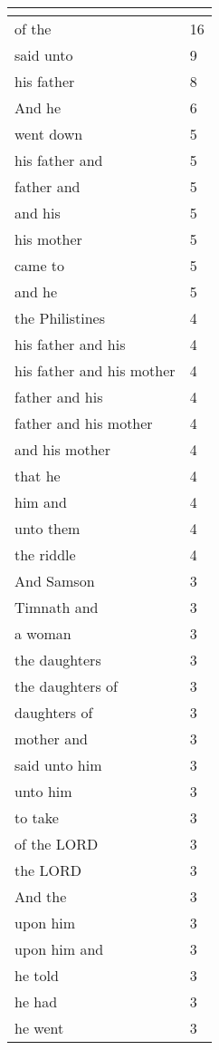\begin{center}
\begin{longtable}{|p{3.0in}|p{0.5in}|}
\hline \multicolumn{2}{c}{{ }} \\ \hline
\endfoot 
of the & 16\\ \hline 
said unto & 9\\ \hline 
his father & 8\\ \hline 
And he & 6\\ \hline 
went down & 5\\ \hline 
his father and & 5\\ \hline 
father and & 5\\ \hline 
and his & 5\\ \hline 
his mother & 5\\ \hline 
came to & 5\\ \hline 
and he & 5\\ \hline 
the Philistines & 4\\ \hline 
his father and his & 4\\ \hline 
his father and his mother & 4\\ \hline 
father and his & 4\\ \hline 
father and his mother & 4\\ \hline 
and his mother & 4\\ \hline 
that he & 4\\ \hline 
him and & 4\\ \hline 
unto them & 4\\ \hline 
the riddle & 4\\ \hline 
And Samson & 3\\ \hline 
Timnath and & 3\\ \hline 
a woman & 3\\ \hline 
the daughters & 3\\ \hline 
the daughters of & 3\\ \hline 
daughters of & 3\\ \hline 
mother and & 3\\ \hline 
said unto him & 3\\ \hline 
unto him & 3\\ \hline 
to take & 3\\ \hline 
of the LORD & 3\\ \hline 
the LORD & 3\\ \hline 
And the & 3\\ \hline 
upon him & 3\\ \hline 
upon him and & 3\\ \hline 
he told & 3\\ \hline 
he had & 3\\ \hline 
he went & 3\\ \hline 

\end{longtable}
\end{center}
